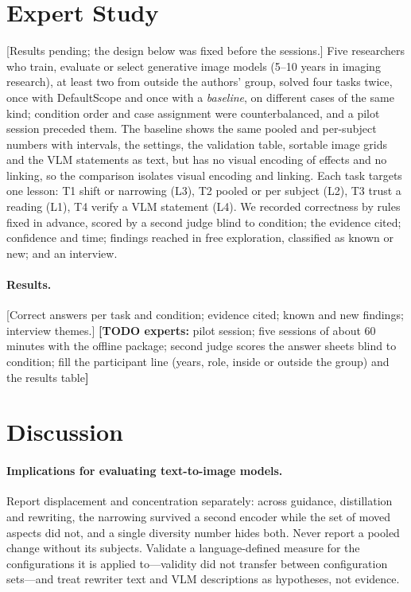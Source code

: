 \documentclass[review]{vgtc}                 %
\newcommand{\pending}[1]{\textcolor{red!70!black}{[#1]}}
\newif\ifdrafttodo \drafttodotrue
\newcommand{\todo}[2]{\ifdrafttodo\textcolor{red!70!black}{\textbf{[TODO #1:} #2\textbf{]}}\fi}
\newcommand{\sysname}{DefaultScope}
\begin{document}
\section{Expert Study}
\label{sec:experts}
\pending{Results pending; the design below was fixed before the sessions.}
Five researchers who train, evaluate or select generative image models (5--10 years in imaging research), at least two from outside the authors' group, solved four tasks twice, once with \sysname{} and once with a \emph{baseline}, on different cases of the same kind; condition order and case assignment were counterbalanced, and a pilot session preceded them. The baseline shows the same pooled and per-subject numbers with intervals, the settings, the validation table, sortable image grids and the VLM statements as text, but has no visual encoding of effects and no linking, so the comparison isolates visual encoding and linking. Each task targets one lesson: T1 shift or narrowing (L3), T2 pooled or per subject (L2), T3 trust a reading (L1), T4 verify a VLM statement (L4). We recorded correctness by rules fixed in advance, scored by a second judge blind to condition; the evidence cited; confidence and time; findings reached in free exploration, classified as known or new; and an interview.
\paragraph{Results.} \pending{Correct answers per task and condition; evidence cited; known and new findings; interview themes.}
\todo{experts}{pilot session; five sessions of about 60 minutes with the offline package; second judge scores the answer sheets blind to condition; fill the participant line (years, role, inside or outside the group) and the results table}

\section{Discussion}

\paragraph{Implications for evaluating text-to-image models.}
Report displacement and concentration separately: across guidance, distillation and rewriting, the narrowing survived a second encoder while the set of moved aspects did not, and a single diversity number hides both. Never report a pooled change without its subjects. Validate a language-defined measure for the configurations it is applied to---validity did not transfer between configuration sets---and treat rewriter text and VLM descriptions as hypotheses, not evidence.
\end{document}
